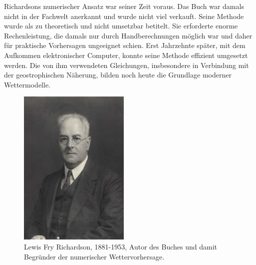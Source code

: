 Richardsons numerischer Ansatz war seiner Zeit voraus.
Das Buch war damals nicht in der Fachwelt anerkannt und wurde nicht viel verkauft. 
Seine Methode wurde als zu theoretisch und nicht umsetzbar betitelt. 
Sie erforderte enorme Rechenleistung, die damals nur durch Handberechnungen möglich war und daher für praktische Vorhersagen ungeeignet schien.  
Erst Jahrzehnte später, mit dem Aufkommen elektronischer Computer, konnte seine Methode effizient umgesetzt werden.  
%
Die von ihm verwendeten Gleichungen, insbesondere in Verbindung mit der geostrophischen Näherung, bilden noch heute die Grundlage moderner Wettermodelle.

\begin{figure}[h]
	\centering
	\includegraphics{Portrait_Richardson.jpg}
	\caption{Lewis Fry Richardson, 1881-1953, Autor des Buches \cite{geostrophisch:wpbnp} und damit Begründer der numerischer Wettervorhersage.}
	\label{bild:portraitRichi}
\end{figure}







